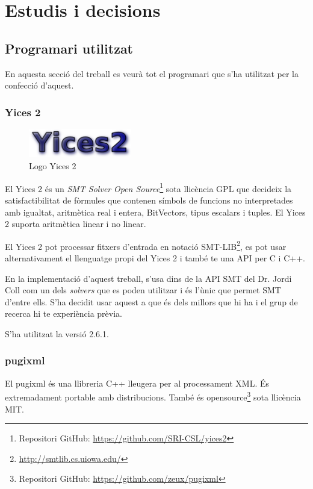 \documentclass[11pt,a4paper,twoside]{report}
\begin{document}
  \chapter{Estudis i decisions}
  \section{Programari utilitzat}
  En aquesta secció del treball es veurà tot el programari que s'ha utilitzat per la confecció d'aquest.
  \subsection{Yices 2}
  \begin{figure}[ht!]
    \centering
    \includegraphics[width=0.4\textwidth]{Diagrames/logoYices.png}
    \caption{Logo Yices 2}
    \label{fig:yices}
  \end{figure}
  El Yices 2 és un \textit{SMT Solver} \textit{Open Source}\footnote{Repositori GitHub: \url{https://github.com/SRI-CSL/yices2}} sota llicència GPL que decideix la satisfactibilitat de fòrmules que contenen símbols de funcions no interpretades amb igualtat, aritmètica real i entera, BitVectors, tipus escalars i tuples. El Yices 2 suporta aritmètica linear i no linear.
  
  El Yices 2 pot processar fitxers d'entrada en notació SMT-LIB\footnote{\url{http://smtlib.cs.uiowa.edu/}}, es pot usar alternativament el llenguatge propi del Yices 2 i també te una API per C i C++.
  
  En la implementació d'aquest treball, s'usa dins de la API SMT del Dr. Jordi Coll com un dels \textit{solvers} que es poden utilitzar i és l'ùnic que permet SMT d'entre ells. S'ha decidit usar aquest a que és dels millors que hi ha i el grup de recerca hi te experiència prèvia. 

  S'ha utilitzat la versió 2.6.1.

  \subsection{pugixml}
  El pugixml és una llibreria C++ lleugera per al processament XML. És extremadament portable amb distribucions. També és opensource\footnote{Repositori GitHub: \url{https://github.com/zeux/pugixml}} sota llicència MIT.
\end{document}
